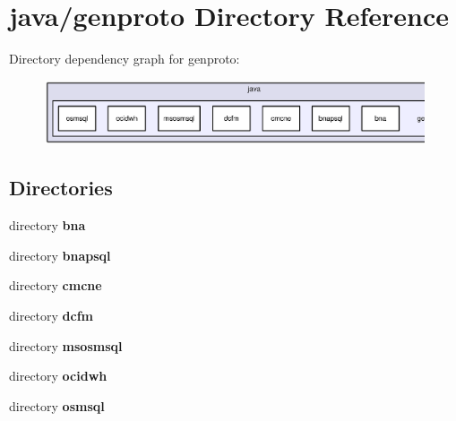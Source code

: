 \section{java/genproto Directory Reference}
\label{dir_0e43b3eaa74cb4b3a4cbe492a3c2d8cb}
Directory dependency graph for genproto\+:\nopagebreak
\begin{figure}[H]
\begin{center}
\leavevmode
\includegraphics[width=350pt]{dir_0e43b3eaa74cb4b3a4cbe492a3c2d8cb_dep}
\end{center}
\end{figure}
\subsection*{Directories}
\begin{DoxyCompactItemize}
\item 
directory {\bf bna}
\item 
directory {\bf bnapsql}
\item 
directory {\bf cmcne}
\item 
directory {\bf dcfm}
\item 
directory {\bf msosmsql}
\item 
directory {\bf ocidwh}
\item 
directory {\bf osmsql}
\end{DoxyCompactItemize}
